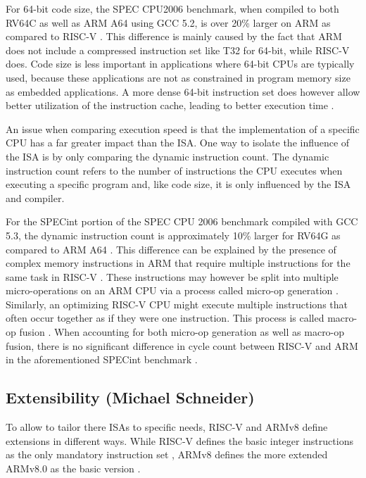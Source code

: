 \documentclass[conference]{IEEEtran}
\begin{document}
	For 64-bit code size, the SPEC CPU2006 benchmark, when compiled to both RV64C as well as ARM A64 using GCC 5.2,
	is over 20\% larger on ARM as compared to RISC-V \cite[page 62]{Waterman2016}.
	This difference is mainly caused by the fact that ARM does not include a compressed instruction set like T32 for 64-bit, while RISC-V does.
	Code size is less important in applications where 64-bit \glspl{CPU} are typically used, because these applications
	are not as constrained in program memory size as embedded applications. A more dense 64-bit instruction set does however allow better utilization of the instruction cache,
	leading to better execution time \cite[slide 46]{Celio2016}.

	An issue when comparing execution speed is that the implementation of a specific \gls{CPU} has a far greater impact than the \gls{ISA}.
	One way to isolate the influence of the ISA is by only comparing the dynamic instruction count.
	The dynamic instruction count refers to the number of instructions the \gls{CPU} executes when executing a specific program
	and, like code size, it is only influenced by the \gls{ISA} and compiler.

	For the SPECint portion of the SPEC CPU 2006 benchmark compiled with GCC 5.3, the dynamic instruction count is approximately
	10\% larger for RV64G as compared to ARM A64 \cite[slide 38]{Celio2016}.
	This difference can be explained by the presence of complex memory instructions in ARM that require multiple instructions
	for the same task in RISC-V \cite[slide 40]{Celio2016}.
	These instructions may however be split into multiple micro-operations on an ARM \gls{CPU} via a process called micro-op generation \cite[slide 40]{Celio2016}.
	Similarly, an optimizing RISC-V CPU might execute multiple instructions that often occur together as if they were one instruction.
	This process is called macro-op fusion \cite[slide 16]{Celio2016}.
	When accounting for both micro-op generation as well as macro-op fusion, there is no significant difference in cycle count between RISC-V and ARM
	in the aforementioned SPECint benchmark \cite[slide 38]{Celio2016}.


	\subsection{Extensibility (Michael Schneider)}\label{sec:extensibility}
	To allow to tailor there \glspl{ISA} to specific needs,  RISC-V and ARMv8 define extensions in different ways. While RISC-V defines the basic integer instructions as the only mandatory instruction set \cite[page 3f]{Waterman2017}, ARMv8 defines the more extended ARMv8.0 as the basic version \cite[page 60]{Arm2020}.
	
\end{document}
